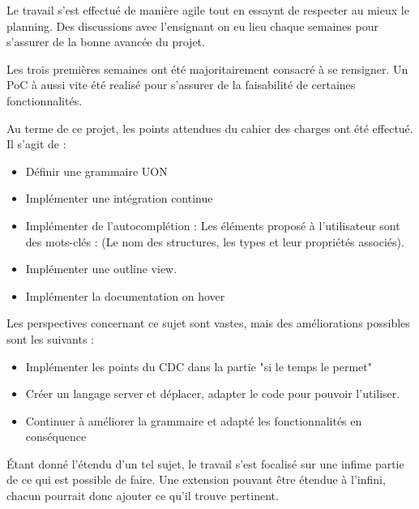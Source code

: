 Le travail s'est effectué de manière agile tout en essaynt de respecter au mieux le planning.
Des discussions avec l'ensignant on eu lieu chaque semaines pour s'assurer de la bonne avancée du projet.

Les trois premières semaines ont été majoritairement consacré à se rensigner.
Un PoC à aussi vite été realisé pour s'assurer de la faisabilité de certaines fonctionnalités.

Au terme de ce projet, les points attendues du cahier des charges ont été effectué. Il s'agit de :
\begin{itemize}
    \item Définir une grammaire UON
    \item Implémenter une intégration continue
    \item Implémenter de l'autocomplétion : Les éléments proposé à l'utilisateur sont des mots-clés : (Le nom des structures, les types et leur propriétés associés).
    \item Implémenter une outline view.
    \item Implémenter la documentation on hover
\end{itemize}

Les perspectives concernant ce sujet sont vastes, mais des améliorations possibles sont les suivants :
\begin{itemize}
    \item Implémenter les points du CDC dans la partie "si le temps le permet"
    \item Créer un langage server et déplacer, adapter le code pour pouvoir l'utiliser.
    \item Continuer à améliorer la grammaire et adapté les fonctionnalités en conséquence
\end{itemize}

Étant donné l'étendu d'un tel sujet, le travail s'est focalisé sur une infime partie de ce qui est possible de faire.
Une extension pouvant être étendue à l'infini, chacun pourrait donc ajouter ce qu'il trouve pertinent.

